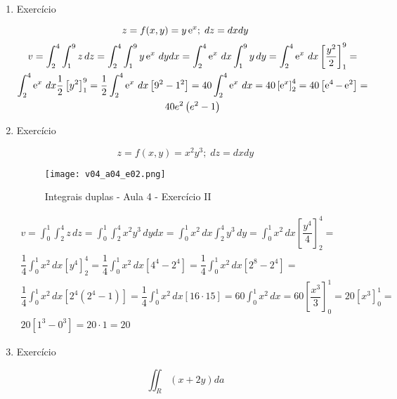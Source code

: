 \begin{enumerate}
	\item Exercício
	
	\begin{equation*}
		z = f(x, y) = y\operatorname{e}^x;\; dz = dx dy	
	\end{equation*}
	\begin{gather*}
		v = \int_2^4 \int_1^9 z\, dz = \int_2^4 \int_1^9 y\operatorname{e}^x\, dy dx = \int_2^4 \operatorname{e}^x\, dx \int_1^9 y\, dy = \int_2^4 \operatorname{e}^x\, dx \left[\dfrac{y^2}{2}\right]_1^9 =\\ \int_2^4 \operatorname{e}^x\, dx \dfrac{1}{2}\left[y^2\right]_1^9 = \dfrac{1}{2}\int_2^4 \operatorname{e}^x\, dx \left[9^2 - 1^2\right] = 40\int_2^4 \operatorname{e}^x\, dx = 40\left[\operatorname{e}^x\right]_2^4 = 40\left[\operatorname{e}^4 - \operatorname{e}^2\right] =\\ 40e^2\left(e^2 - 1\right)	
	\end{gather*}
	
	\item Exercício
	
	\begin{equation*}
		z = f(x,y) = x^2y^3;\; dz = dx dy
	\end{equation*}
	
	\begin{figure}[htb]
		\caption{Integrais duplas - Aula 4 - Exercício II}
		\label{v04_a04_e02}
		\centering
		\texttt{[image: v04\_a04\_e02.png]}		
	\end{figure}
	
	\begin{gather*}
		v = \int_0^1 \int_2^4 z\, dz = \int_0^1 \int_2^4 x^2y^3\, dy dx = \int_0^1 x^2\, dx \int_2^4 y^3\, dy = \int_0^1 x^2\, dx \left[\dfrac{y^4}{4}\right]_2^4 =\\ \dfrac{1}{4}\int_0^1 x^2\, dx \left[y^4\right]_2^4 = \dfrac{1}{4}\int_0^1 x^2\, dx \left[4^4 - 2^4\right] = \dfrac{1}{4}\int_0^1 x^2\, dx \left[2^8 - 2^4\right] =\\ \dfrac{1}{4}\int_0^1 x^2\, dx \left[2^4\left(2^4 - 1\right)\right] = \dfrac{1}{4}\int_0^1 x^2\, dx \left[16 \cdot 15\right] = 60\int_0^1 x^2\, dx = 60 \left[\dfrac{x^3}{3}\right]_0^1 = 20 \left[x^3\right]_0^1 =\\ 20 \left[1^3 - 0^3\right] = 20 \cdot 1 =  20
	\end{gather*}
	
	\item Exercício
	
	\begin{equation*}
		\iint_R (x + 2y) da
	\end{equation*}
	

\end{enumerate}
